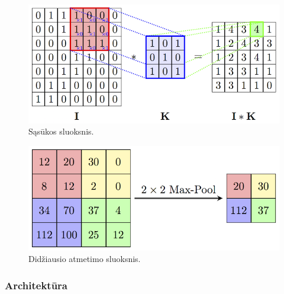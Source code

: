 \documentclass{VUMIFInfKursinis}
\begin{document}
\begin{figure}[h!]
\centering
  \includegraphics[scale=1.3]{img/conv2d}
  \caption{Sąsūkos sluoksnis.}
  \label{fig:conv2d}
\end{figure}


\begin{figure}[h!]
\centering
  \includegraphics[scale=1.3]{img/maxpool2d}
  \caption{Didžiausio atmetimo sluoksnis.}
  \label{fig:maxpool2d}
\end{figure}



\newpage

\subsubsection{Architektūra}
\end{document}
